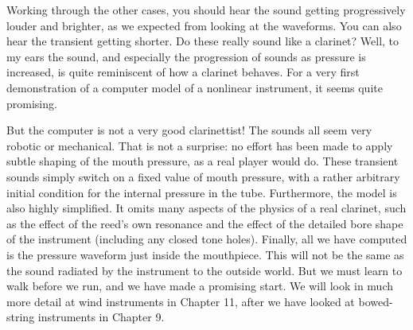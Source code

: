  Working through the other cases, you should hear the sound getting 
  progressively louder and brighter, as we expected from looking at the 
  waveforms. You can also hear the transient getting shorter. Do these really 
  sound like a clarinet? Well, to my ears the sound, and especially the 
  progression of sounds as pressure is increased, is quite reminiscent of how a 
  clarinet behaves. For a very first demonstration of a computer model of a 
  nonlinear instrument, it seems quite promising. 

  But the computer is not a very good clarinettist! The sounds all seem very 
  robotic or mechanical. That is not a surprise: no effort has been made to 
  apply subtle shaping of the mouth pressure, as a real player would do. These 
  transient sounds simply switch on a fixed value of mouth pressure, with a 
  rather arbitrary initial condition for the internal pressure in the tube. 
  Furthermore, the model is also highly simplified. It omits many aspects of 
  the physics of a real clarinet, such as the effect of the reed's own 
  resonance and the effect of the detailed bore shape of the instrument 
  (including any closed tone holes). Finally, all we have computed is the 
  pressure waveform just inside the mouthpiece. This will not be the same as 
  the sound radiated by the instrument to the outside world. But we must learn 
  to walk before we run, and we have made a promising start. We will look in 
  much more detail at wind instruments in Chapter 11, after we have looked at 
  bowed-string instruments in Chapter 9. 

